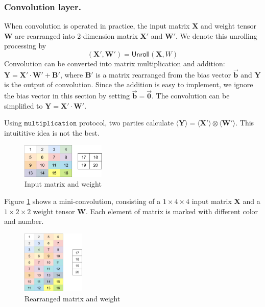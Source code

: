 \documentclass[letterpaper]{article} %
\begin{document}
    \subsubsection{Convolution layer.}


    When convolution is operated in practice,
    the input matrix $\mathbf{X}$ and weight tensor $\mathbf{W}$
    are rearranged into 2-dimension matrix $\mathbf{X}'$ and $\mathbf{W}'$.
    We denote this unrolling processing by
    $$(\mathbf{X}',\mathbf{W}')=\mathsf{Unroll} (\mathbf{X},W)$$
    Convolution can be converted into matrix multiplication and addition:
    $\mathbf{Y}=\mathbf{X}'\cdot \mathbf{W}'+\mathbf{B}'$, where $\mathbf{B}'$ is a matrix rearranged from the bias vector $\overrightarrow{\mathbf{b}}$ and
    $\mathbf{Y}$ is the output of convolution.
    Since the addition is easy to implement, we ignore the bias vector in this section by setting $\overrightarrow{\mathbf{b}}=\overrightarrow{\mathbf{0}}$.
    The convolution can be simplified to $\mathbf{Y}=\mathbf{X}'\cdot \mathbf{W}'$.

    Using $\mathtt{multiplication}$ protocol,
    two parties calculate $\langle \mathbf{Y}\rangle=\langle \mathbf{X'}\rangle\otimes \langle \mathbf{W'}\rangle$.
    This intuititive idea is not the best.
    \begin{figure}[htbp]
        \centering
        \includegraphics[width=4cm]{new_unrolling.png}
        \caption{Input matrix and weight}
        \label{input matrix and weight}
    \end{figure}

    Figure \ref{input matrix and weight} shows a mini-convolution,
    consisting of a $1\times 4\times 4$ input matrix $\mathbf{X}$  and a $1\times 2\times 2$ weight tensor $\mathbf{W}$.
    Each element of matrix is marked with different color and number.
    \begin{figure}[htbp]
        \centering
        \includegraphics[width=3cm]{new_unrolling2.png}
        \caption{Rearranged matrix and weight}
        \label{rearrangement of matrix and weight}
    \end{figure}
\end{document}
